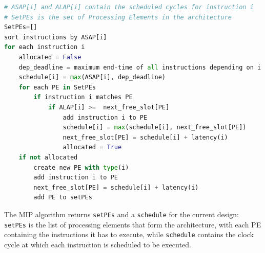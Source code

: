 \begin{lstlisting}[language=Python, caption={\small Modified Interval Partitioning (MIP) Algorithm}, label={lst:modified_interval_partitioning}, basicstyle=\tiny]
# ASAP[i] and ALAP[i] contain the scheduled cycles for instruction i
# SetPEs is the set of Processing Elements in the architecture
SetPEs=[]
sort instructions by ASAP[i]
for each instruction i
	allocated = False
	dep_deadline = maximum end-time of all instructions depending on i
	schedule[i] = max(ASAP[i], dep_deadline)
	for each PE in SetPEs
		if instruction i matches PE
			if ALAP[i] >=  next_free_slot[PE]
				add instruction i to PE
				schedule[i] = max(schedule[i], next_free_slot[PE])
				next_free_slot[PE] = schedule[i] + latency(i)
				allocated = True
	if not allocated
		create new PE with type(i)
		add instruction i to PE
		next_free_slot[PE] = schedule[i] + latency(i)
		add PE to setPEs
\end{lstlisting}


The MIP algorithm returns \verb|setPEs| and a \verb|schedule| for the current design: \verb|setPEs| is the list of processing elements that form the architecture, with each PE containing the instructions it has to execute, while \verb|schedule| contains the clock cycle at which each instruction is scheduled to be executed.

\vspace{-1mm}
